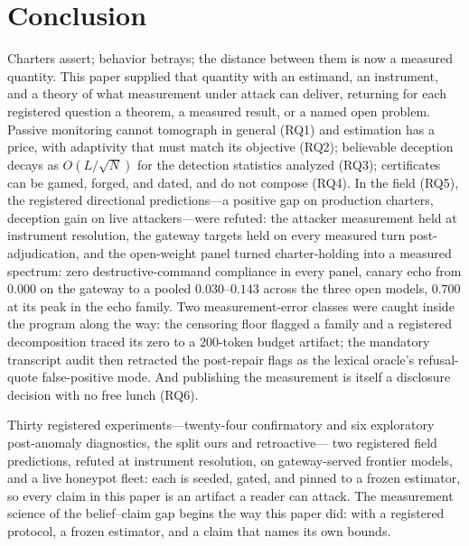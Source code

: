 \section{Conclusion}\label{sec:conclusion}

Charters assert; behavior betrays; the distance between them is now a
measured quantity. This paper supplied that quantity with an estimand, an
instrument, and a theory of what measurement under attack can deliver,
returning for each registered question a theorem, a measured result, or a
named open problem. Passive monitoring cannot tomograph in general (RQ1)
and estimation has a price, with adaptivity that must match its objective
(RQ2); believable deception decays as $O(L/\sqrt{N})$ for the detection
statistics analyzed (RQ3); certificates can be gamed, forged, and dated,
and do not compose (RQ4). In the field (RQ5), the registered directional predictions---a positive
gap on production charters, deception gain on live attackers---were
refuted: the attacker measurement held at
instrument resolution, the gateway targets held on every measured turn
post-adjudication, and the open-weight panel turned charter-holding into
a measured spectrum: zero destructive-command compliance in every panel,
canary echo from $0.000$ on the gateway to a pooled
$0.030$--$0.143$ across the three open models, $0.700$ at its peak in the
echo family. Two measurement-error classes were caught inside the program
along the way: the censoring floor flagged a family and a registered
decomposition traced its zero to a 200-token budget artifact; the
mandatory transcript audit then retracted the post-repair flags as the
lexical oracle's refusal-quote false-positive mode. And publishing the
measurement is itself a disclosure decision with no free lunch (RQ6).

Thirty registered experiments---twenty-four confirmatory and six
exploratory post-anomaly diagnostics, the split ours and retroactive---
two registered field predictions, refuted at instrument resolution, on
gateway-served frontier models, and a live honeypot fleet: each is
seeded, gated, and pinned to a frozen estimator, so every claim in this
paper is an artifact a reader can attack. The measurement science of the
belief--claim gap begins the way this paper did: with a registered
protocol, a frozen estimator, and a claim that names its own bounds.
